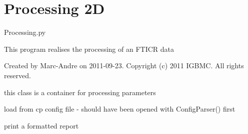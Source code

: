 \documentclass[letterpaper,10pt,openany,oneside]{sphinxmanual}
\begin{document}
\section{Processing 2D}
\label{rst/code:processing-2d}\label{rst/code:module-processing}
Processing.py

This program realises the processing of an FTICR data

Created by Marc-Andre on 2011-09-23.
Copyright (c) 2011 IGBMC. All rights reserved.

\begin{fulllineitems}
\label{rst/code:processing.Proc_Parameters}
this class is a container for processing parameters

\begin{fulllineitems}
\label{rst/code:processing.Proc_Parameters.load}
load from cp config file - should have been opened with ConfigParser() first

\end{fulllineitems}


\begin{fulllineitems}
\label{rst/code:processing.Proc_Parameters.report}
print a formatted report

\end{fulllineitems}


\end{fulllineitems}

\end{document}
